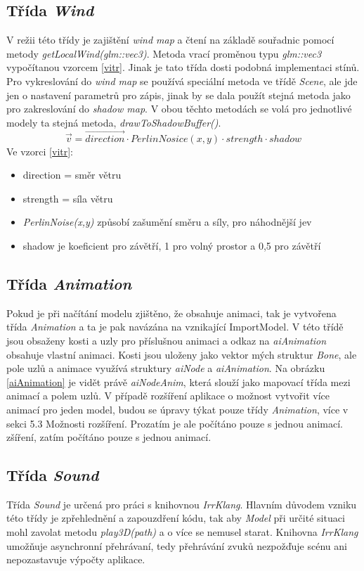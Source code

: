 \subsection{Třída \emph{Wind}}
V režii této třídy je zajištění \emph{wind map} a čtení na základě souřadnic pomocí metody \emph{getLocalWind(glm::vec3)}. Metoda vrací proměnou typu \emph{glm::vec3} vypočítanou vzorcem \ref{vitr}. Jinak je tato třída dosti podobná implementaci stínů. Pro vykreslování do \emph{wind map} se používá speciální metoda ve třídě \emph{Scene}, ale jde jen o nastavení parametrů pro zápis, jinak by se dala použít stejná metoda jako pro zakreslování do \emph{shadow map}. V obou těchto metodách se volá pro jednotlivé modely ta stejná metoda, \emph{drawToShadowBuffer()}. 
\begin{equation}\label{vitr}
\vec{v} = \overrightarrow{direction} \cdot PerlinNosice(x,y) \cdot strength \cdot shadow
\end{equation}
Ve vzorci \ref{vitr}:
\begin{itemize}
	\item direction = směr větru
	\item strength = síla větru
	\item \emph{PerlinNoise(x,y)} způsobí zašumění směru a síly, pro náhodnější jev
	\item shadow je koeficient pro závětří, 1 pro volný prostor a 0,5 pro závětří
\end{itemize}
\subsection{Třída \emph{Animation}}
Pokud je při načítání modelu zjištěno, že obsahuje animaci, tak je vytvořena třída \emph{Animation} a ta je pak navázána na vznikající ImportModel. V této třídě jsou obsaženy kosti a uzly pro příslušnou animaci a odkaz na \emph{aiAnimation} obsahuje vlastní animaci. Kosti jsou uloženy jako vektor mých struktur \emph{Bone}, ale pole uzlů a animace využívá struktury \emph{aiNode} a \emph{aiAnimation}. Na obrázku \ref{aiAnimation} je vidět právě \emph{aiNodeAnim}, která slouží jako mapovací třída mezi animací a polem uzlů. V případě rozšíření aplikace o možnost vytvořit více animací pro jeden model, budou se úpravy týkat pouze třídy \emph{Animation}, více v sekci 5.3 Možnosti rozšíření. Prozatím je ale počítáno pouze s jednou animací.
zšíření, zatím počítáno pouze s jednou animací. 
\subsection{Třída \emph{Sound}}
Třída \emph{Sound} je určená pro práci s knihovnou \emph{IrrKlang}\cite{irrKlang}. Hlavním důvodem vzniku této třídy je zpřehlednění a zapouzdření kódu, tak aby \emph{Model} při určité situaci mohl zavolat metodu \emph{play3D(path)} a o více se nemusel starat. Knihovna \emph{IrrKlang} umožňuje asynchronní přehrávaní, tedy přehrávání zvuků nezpožďuje scénu ani nepozastavuje výpočty aplikace.

